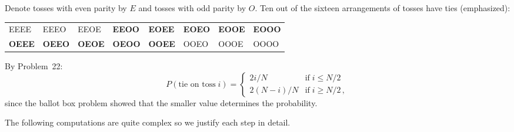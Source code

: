 \solution{}

 Denote tosses with even parity by $E$ and tosses with odd parity by $O$. Ten out of the sixteen arrangements of tosses have ties (emphasized):
\begin{center}
\begin{tabular}{llllllll}
EEEE & EEEO & EEOE & \textbf{EEOO} & \textbf{EOEE} & \textbf{EOEO} &\textbf{EOOE} & \textbf{EOOO}\\
\textbf{OEEE} & \textbf{OEEO} & \textbf{OEOE} & \textbf{OEOO} & \textbf{OOEE} & OOEO&OOOE & OOOO
\end{tabular}
\end{center}

By Problem~22:
\begin{equation}\label{eq.coins-ties}
P(\textrm{tie on toss}\;i)=
\left\{
\begin{array}{ll}
2i/N &\textrm{if}\; i\leq N/2\\
2(N-i)/N& \textrm{if}\; i\geq N/2\,,
\end{array}
\right.
\end{equation}
since the ballot box problem showed that the smaller value determines the probability.

The following computations are quite complex so we justify each step in detail.

